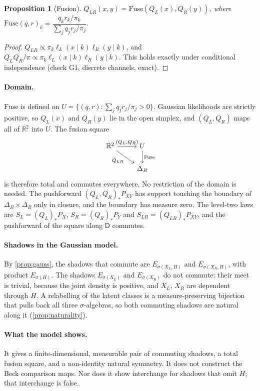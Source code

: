 \documentclass[11pt]{article}
\newtheorem{proposition}[theorem]{Proposition}
\theoremstyle{definition}
\newcommand{\D}{\mathsf D}
\newcommand{\R}{\mathbb R}
\begin{document}
\begin{proposition}[Fusion]\label{prop:fusion}
$Q_{LR}(x,y)=\mathrm{Fuse}(Q_L(x),Q_R(y))$, where $\mathrm{Fuse}(q,r)_k=\dfrac{q_kr_k/\pi_k}{\sum_jq_jr_j/\pi_j}$.
\end{proposition}
\begin{proof}
$Q_{LR}\propto\pi_k\ell_L(x\mid k)\ell_R(y\mid k)$, and $Q_LQ_R/\pi\propto\pi_k\ell_L(x\mid k)\ell_R(y\mid k)$. This holds exactly under
conditional independence (check G1, discrete channels, exact).
\end{proof}

\paragraph{Domain.} $\mathrm{Fuse}$ is defined on $U=\{(q,r):\sum_jq_jr_j/\pi_j>0\}$. Gaussian likelihoods are strictly positive, so
$Q_L(x)$ and $Q_R(y)$ lie in the open simplex, and $(Q_L,Q_R)$ maps all of $\R^2$ into $U$. The fusion square
\[
\begin{tikzcd}
\R^2\arrow[r,"{(Q_L,Q_R)}"]\arrow[dr,"Q_{LR}"'] & U\arrow[d,"\mathrm{Fuse}"]\\ & \Delta_B
\end{tikzcd}
\]
is therefore total and commutes everywhere. No restriction of the domain is needed. The pushforward $(Q_L,Q_R)_*P_{XY}$ has support
touching the boundary of $\Delta_B\times\Delta_B$ only in closure, and the boundary has measure zero. The level-two laws are
$S_L=(Q_L)_*P_X$, $S_R=(Q_R)_*P_Y$ and $S_{LR}=(Q_{LR})_*P_{XY}$, and the pushforward of the square along $\D$ commutes.

\paragraph{Shadows in the Gaussian model.} By \cref{prop:gauss}, the shadows that commute are $E_{\sigma(X_L,H)}$ and
$E_{\sigma(X_R,H)}$, with product $E_{\sigma(H)}$. The shadows $E_{\sigma(X_L)}$ and $E_{\sigma(X_R)}$ do not commute: their meet is
trivial, because the joint density is positive, and $X_L$, $X_R$ are dependent through $H$. A relabelling of the latent classes is a
measure-preserving bijection that pulls back all three $\sigma$-algebras, so both commuting shadows are natural along it
(\cref{prop:naturality}).

\paragraph{What the model shows.} It gives a finite-dimensional, measurable pair of commuting shadows, a total fusion square, and a
non-identity natural symmetry. It does not construct the Beck comparison maps. Nor does it show interchange for shadows that omit
$H$; that interchange is false.
\end{document}
